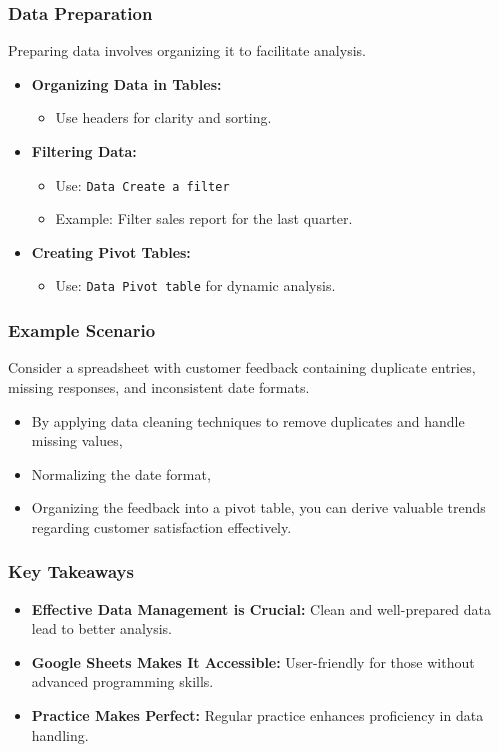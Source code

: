 \documentclass[aspectratio=169]{beamer}
\begin{document}
\begin{frame}[fragile]
    \frametitle{Data Preparation}
    Preparing data involves organizing it to facilitate analysis.

    \begin{itemize}
        \item \textbf{Organizing Data in Tables:}
            \begin{itemize}
                \item Use headers for clarity and sorting.
            \end{itemize}

        \item \textbf{Filtering Data:}
            \begin{itemize}
                \item Use: \texttt{Data \textrightarrow Create a filter}
                \item Example: Filter sales report for the last quarter.
            \end{itemize}

        \item \textbf{Creating Pivot Tables:}
            \begin{itemize}
                \item Use: \texttt{Data \textrightarrow Pivot table} for dynamic analysis.
            \end{itemize}
    \end{itemize}
\end{frame}

\begin{frame}[fragile]
    \frametitle{Example Scenario}
    Consider a spreadsheet with customer feedback containing duplicate entries, missing responses, and inconsistent date formats.
    
    \begin{itemize}
        \item By applying data cleaning techniques to remove duplicates and handle missing values,
        \item Normalizing the date format,
        \item Organizing the feedback into a pivot table, you can derive valuable trends regarding customer satisfaction effectively.
    \end{itemize}
\end{frame}

\begin{frame}[fragile]
    \frametitle{Key Takeaways}
    \begin{itemize}
        \item \textbf{Effective Data Management is Crucial:} Clean and well-prepared data lead to better analysis.
        \item \textbf{Google Sheets Makes It Accessible:} User-friendly for those without advanced programming skills.
        \item \textbf{Practice Makes Perfect:} Regular practice enhances proficiency in data handling.
    \end{itemize}
\end{frame}
\end{document}
